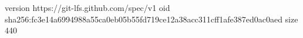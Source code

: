 version https://git-lfs.github.com/spec/v1
oid sha256:fc3e14a6994988a55ca0eb05b55fd719ce12a38acc311cff1afe387ed0ac0aed
size 440
